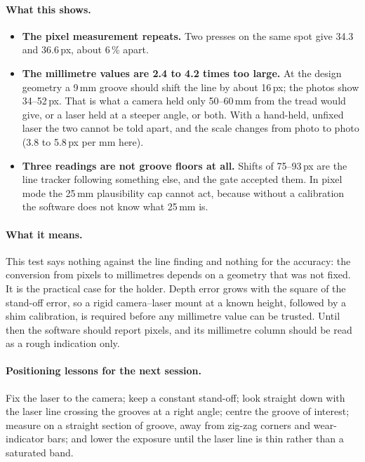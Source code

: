 \paragraph{What this shows.}
\begin{itemize}
\item \textbf{The pixel measurement repeats.} Two presses on the same spot give 34.3 and 36.6\,px, about 6\,\% apart.
\item \textbf{The millimetre values are 2.4 to 4.2 times too large.} At the design geometry a 9\,mm groove should shift
      the line by about 16\,px; the photos show 34--52\,px. That is what a camera held only 50--60\,mm from the
      tread would give, or a laser held at a steeper angle, or both. With a hand-held, unfixed laser the two cannot
      be told apart, and the scale changes from photo to photo (3.8 to 5.8\,px per mm here).
\item \textbf{Three readings are not groove floors at all.} Shifts of 75--93\,px are the line tracker following
      something else, and the gate accepted them. In pixel mode the 25\,mm plausibility cap cannot act, because
      without a calibration the software does not know what 25\,mm is.
\end{itemize}

\paragraph{What it means.} This test says nothing against the line finding and nothing for the accuracy: the
conversion from pixels to millimetres depends on a geometry that was not fixed. It is the practical case for the
holder. Depth error grows with the square of the stand-off error, so a rigid camera--laser mount at a known height,
followed by a shim calibration, is required before any millimetre value can be trusted. Until then the software
should report pixels, and its millimetre column should be read as a rough indication only.

\paragraph{Positioning lessons for the next session.} Fix the laser to the camera; keep a constant stand-off;
look straight down with the laser line crossing the grooves at a right angle; centre the groove of interest;
measure on a straight section of groove, away from zig-zag corners and wear-indicator bars; and lower the
exposure until the laser line is thin rather than a saturated band.
